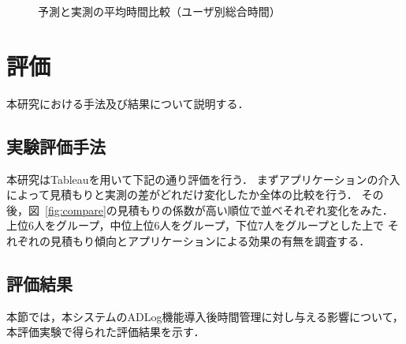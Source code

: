 \begin{figure}[hb]
	\begin{center}
		\caption{予測と実測の平均時間比較（ユーザ別総合時間）}
		\label{fig:compare4}
	\end{center}
\end{figure}

\chapter{評価}
本研究における手法及び結果について説明する．

\section{実験評価手法}
本研究はTableau\cite{tableau}を用いて下記の通り評価を行う．
まずアプリケーションの介入によって見積もりと実測の差がどれだけ変化したか全体の比較を行う．
その後，図~\ref{fig:compare}の見積もりの係数が高い順位で並べそれぞれ変化をみた．
上位6人をグループ，中位上位6人をグループ，下位7人をグループとした上で
それぞれの見積もり傾向とアプリケーションによる効果の有無を調査する．

\section{評価結果}
本節では，本システムのADLog機能導入後時間管理に対し与える影響について，本評価実験で得られた評価結果を示す．
